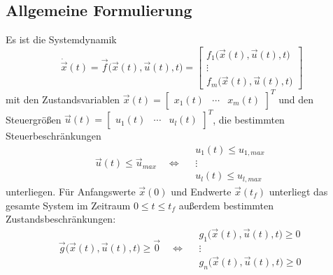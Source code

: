 		\subsection{Allgemeine Formulierung}
			Es ist die Systemdynamik
			\begin{equation*}
				\dot{\vec{x}}(t) = \vec{f}\big(\vec{x}(t), \vec{u}(t), t\big) =
					\begin{bmatrix}
						f_1\big(\vec{x}(t), \vec{u}(t), t\big) \\
						\vdots \\
						f_m\big(\vec{x}(t), \vec{u}(t), t\big)
					\end{bmatrix}
			\end{equation*}
			mit den Zustandsvariablen \( \vec{x}(t) = \begin{bmatrix} x_1(t) & \cdots & x_m(t) \end{bmatrix}^T \) und den Steuergrößen \( \vec{u}(t) = \begin{bmatrix} u_1(t) & \cdots & u_l(t) \end{bmatrix}^T \), die bestimmten Steuerbeschränkungen
			\begin{equation*}
				\vec{u}(t) \leq \vec{u}_\mathit{max} \quad\iff\quad
					\begin{matrix}
						u_1(t) \leq u_{1, \mathit{max}} \\
						\vdots \\
						u_l(t) \leq u_{l, \mathit{max}}
					\end{matrix}
			\end{equation*}
			unterliegen. Für Anfangswerte \( \vec{x}(0) \) und Endwerte \( \vec{x}(t_f) \) unterliegt das gesamte System im Zeitraum \( 0 \leq t \leq t_f \) außerdem bestimmten Zustandsbeschränkungen:
			\begin{equation*}
				\vec{g}\big(\vec{x}(t), \vec{u}(t), t\big) \geq \vec{0} \quad\iff\quad
					\begin{matrix}
						g_1\big(\vec{x}(t), \vec{u}(t), t\big) \geq 0 \\
						\vdots \\
						g_n\big(\vec{x}(t), \vec{u}(t), t\big) \geq 0
					\end{matrix}
			\end{equation*}
			
